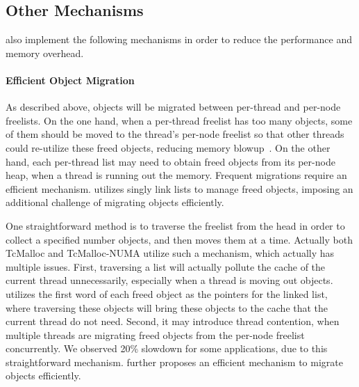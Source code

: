 
\subsection{Other Mechanisms}
\label{sec: others}
\NM{} also implement the following mechanisms in order to reduce the performance and memory overhead. 


\label{sec:moveobjects}

\paragraph{Efficient Object Migration} As described above, objects will be migrated between per-thread and per-node freelists. On the one hand, when a per-thread freelist has too many objects, some of them should be moved to the thread's per-node freelist so that other threads could re-utilize these freed objects, reducing memory blowup~\cite{Hoard}. On the other hand, each per-thread list may need to obtain freed objects from its per-node heap, when a thread is running out the memory. Frequent migrations require an efficient mechanism. \NM{} utilizes singly link lists to manage freed objects, imposing an additional challenge of migrating objects efficiently. 

One straightforward method is to traverse the  freelist from the head in order to collect a specified number objects, and then moves them at a time. Actually both TcMalloc and TcMalloc-NUMA utilize such a mechanism, which   actually has multiple issues. First, traversing a list will actually pollute the cache of the current thread unnecessarily, especially when a thread is moving out objects. \NM{} utilizes the first word of each freed object as the pointers for the linked list, where traversing these objects will bring these objects to the cache that the current thread do not need. Second, it may introduce thread contention, when multiple threads are migrating freed objects from the per-node freelist concurrently. We observed  20\% slowdown for some applications, due to this straightforward mechanism. \NM{} further proposes an efficient mechanism to migrate objects efficiently. 

